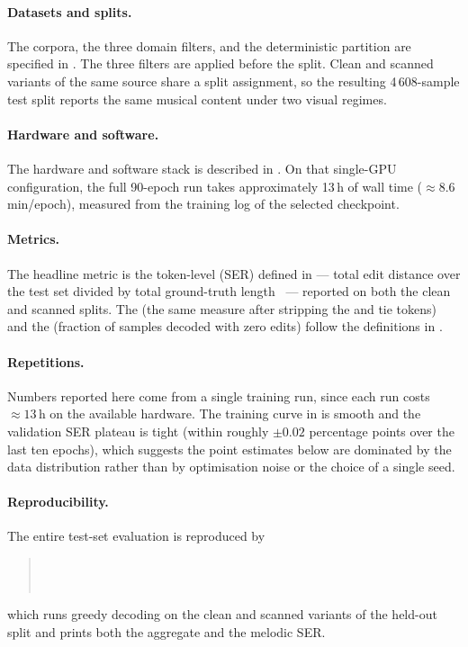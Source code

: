 \paragraph{Datasets and splits.}
The corpora, the three domain filters, and the deterministic
 partition are specified in
. The three filters are applied before the
split. Clean and scanned variants of the same source share a split
assignment, so the resulting 4\,608-sample test split reports the same
musical content under two visual regimes.

\paragraph{Hardware and software.}
The hardware and software stack is described in .
On that single-GPU configuration, the full 90-epoch run takes
approximately 13\,h of wall time ($\approx 8.6$\,min/epoch),
measured from the training log of the selected checkpoint.

\paragraph{Metrics.}
The headline metric is the token-level  (SER)
defined in  --- total edit distance over the test
set divided by total ground-truth
length~\cite{levenshteinBinaryCodes1966,hajicOMRMetricsEvaluation2019} --- reported
on both the clean and scanned splits. The  (the same
measure after stripping the  and tie tokens) and the
 (fraction of samples decoded with
zero edits) follow the definitions in .

\paragraph{Repetitions.}
Numbers reported here come from a single training run, since each run
costs $\approx 13$\,h on the available hardware.
The training curve in  is smooth and the
validation SER plateau is tight (within roughly $\pm 0.02$ percentage
points over the last ten epochs), which suggests the point estimates
below are dominated by the data distribution rather than by
optimisation noise or the choice of a single seed.

\paragraph{Reproducibility.}
The entire test-set evaluation is reproduced by
%
\begin{quote}
\\
\\
\end{quote}
%
which runs greedy decoding on the clean and scanned variants of the
held-out split and prints both the aggregate and the melodic SER.

